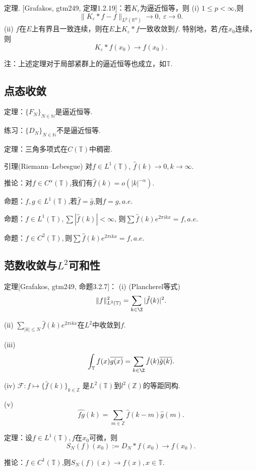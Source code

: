 定理. [Grafakos, gtm249, 定理1.2.19]：若$K_\varepsilon$为逼近恒等，则
    (i) $1\leq p<\infty$,则
    $$\|K_\varepsilon*f-f\|_{L^p(\mathbb{R}^n)}\to 0,\ \varepsilon \to 0.$$
    (ii) $f$在$E$上有界且一致连续，则在$E$上$K_\varepsilon *f$一致收敛到$f$.
    特别地，若$f$在$x_0$连续，则$$K_\varepsilon*f(x_0)\to f(x_0).$$

注：上述定理对于局部紧群上的逼近恒等也成立，如$\mathbb{T}$.




\subsection{点态收敛}
定理：$\{ F_N \}_{N\in \mathbb{N}}$是逼近恒等.

练习：$\{ D_N \}_{N\in \mathbb{N}}$不是逼近恒等.

定理：三角多项式在$C(\mathbb{T})$中稠密.

引理(Riemann--Lebesgue)
对$f\in L^1(\mathbb{T})$, $\hat{f}(k)\to0,k\to \infty.$

推论：对$f\in C^\alpha(\mathbb{T})$,我们有$\hat{f}(k)=o(|k|^{-\alpha})$.

命题：$f,g\in L^1(\mathbb{T})$,若$\hat{f}=\hat{g}$,则$f=g,a.e.$

命题：$f\in L^1(\mathbb{T}),\sum |\hat{f}(k)| < \infty$,
则$\sum \hat{f}(k)e^{2\pi ikx}=f ,a.e.$

命题：$f\in C^2(\mathbb{T}),$则$\sum \hat{f}(k)e^{2\pi ikx}=f ,a.e.$

\subsection{范数收敛与$L^2$可和性}
定理[Grafakos, gtm249, 命题3.2.7]：
(i) (Plancherel等式)$$\|f\|^2_{L^2(\mathbb{T})} 
=\sum_{k\in\Z} |\hat{f}(k)|^2.$$

(ii) $\sum_{|k|\leq N} \hat{f}(k)e^{2\pi ikx}$在$L^2$中收敛到$f$.

(iii)$$\int _{\mathbb{T}}f(x)\overline{g(x)}
=\sum_{k\in\Z} \hat{f}(k)\overline{\hat{g}(k)}.$$

(iv) $\mathcal{F}\colon f\mapsto\{ \hat{f}(k) \}_{k\in \mathbb{Z}}$
是$L^2(\mathbb{T})$到$l^2(\mathbb{Z})$的等距同构.

(v)$$\widehat{fg}(k)=\sum_{m\in \mathbb{Z}}\hat{f}(k-m)\hat{g}(m).$$

定理：设$f\in L^1(\mathbb{T}),f$在$x_0$可微，则
$$S_N(f)(x_0):=D_N*f(x_0)\to f(x_0).$$

推论：$f\in C^1(\mathbb{T})$,则$S_N(f)(x)\to f(x),x\in \mathbb{T}.$

